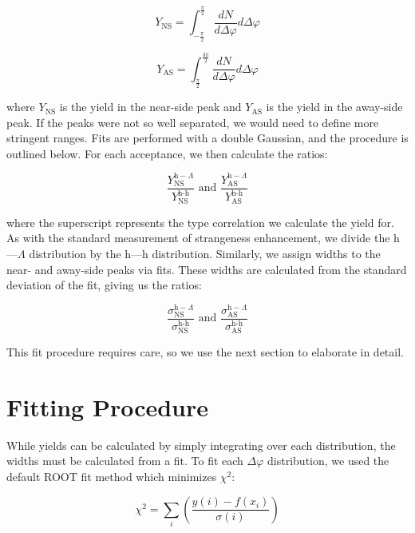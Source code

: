 \documentclass[../main.tex]{subfiles}
\begin{document}
\begin{equation}
    Y_{\text{NS}} = \int_{-\frac{\pi}{2}}^{\frac{\pi}{2}} \frac{dN}{d \Delta \varphi} d\Delta\varphi
\end{equation}

\begin{equation}
    Y_{\text{AS}} = \int_{\frac{\pi}{2}}^{\frac{3\pi}{2}} \frac{dN}{d \Delta \varphi} d\Delta\varphi
\end{equation}

where $Y_{\text{NS}}$ is the yield in the near-side peak and $Y_{\text{AS}}$ is the yield in the away-side peak. If the peaks were not so well separated, we would need to define more stringent ranges. Fits are performed with a double Gaussian, and the procedure is outlined below. For each acceptance, we then calculate the ratios: 

\begin{equation}
    \frac{Y^{\text{h}-\Lambda}_\text{NS}}{Y^{\text{h-h}}_\text{NS}} \text{ and } \frac{Y^{\text{h}-\Lambda}_\text{AS}}{Y^{\text{h-h}}_\text{AS}}
\end{equation}

where the superscript represents the type correlation we calculate the yield for. As with the standard measurement of strangeness enhancement, we divide the h---$\Lambda$ distribution by the h---h distribution. Similarly, we assign widths to the near- and away-side peaks via fits. These widths are calculated from the standard deviation of the fit, giving us the ratios:

\begin{equation}
    \frac{\sigma^{\text{h}-\Lambda}_\text{NS}}{\sigma^{\text{h-h}}_\text{NS}} \text{ and } \frac{\sigma^{\text{h}-\Lambda}_\text{AS}}{\sigma^{\text{h-h}}_\text{AS}}
\end{equation}

This fit procedure requires care, so we use the next section to elaborate in detail.

\section{Fitting Procedure} \label{sxn:fits}
While yields can be calculated by simply integrating over each distribution, the widths must be calculated from a fit. To fit each $\Delta\varphi$ distribution, we used the default ROOT fit method which minimizes $\chi^2$:

\begin{equation}
    \chi^2 = \sum_i \left(\frac{y(i) - f(x_i)}{\sigma(i)}\right)
\end{equation}
\end{document}

